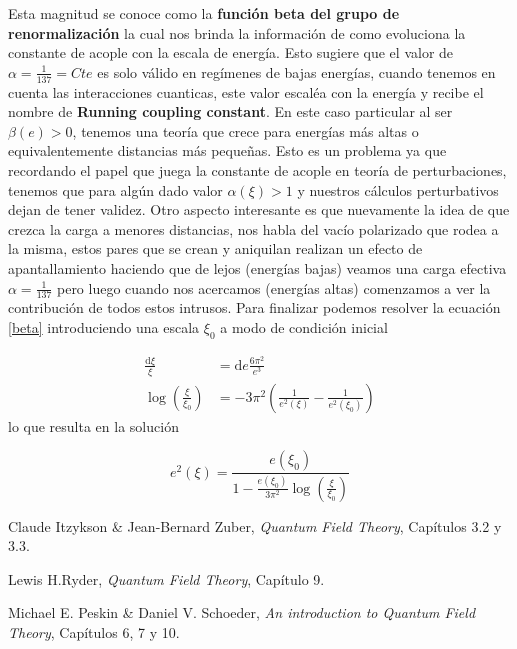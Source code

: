 \documentclass[tickz]{article}
\numberwithin{equation}{section}
\begin{document}
Esta magnitud se conoce como la \textbf{función beta del grupo de renormalización} la cual nos brinda la información de como evoluciona la constante de acople con la escala de energía.  Esto sugiere que el valor de $ \alpha= \frac{1}{137}=Cte $ es solo válido en regímenes de bajas energías, cuando tenemos en cuenta las interacciones cuanticas, este valor escaléa con la energía y recibe el nombre de \textbf{Running coupling constant}. En este caso particular al ser $ \beta(e)>0 $, tenemos una teoría que crece para energías más altas o equivalentemente distancias más pequeñas. Esto es un problema ya que recordando el papel que juega la constante de acople en teoría de perturbaciones, tenemos que para algún dado valor $ \alpha(\xi)>1  $ y nuestros cálculos perturbativos dejan de tener validez. Otro aspecto interesante es que nuevamente la idea de que crezca la carga a menores distancias, nos habla del vacío polarizado que rodea a la misma, estos pares que se crean y aniquilan realizan un efecto de apantallamiento haciendo que de lejos (energías bajas) veamos una carga efectiva $ \alpha =\frac{1}{137} $ pero luego cuando nos acercamos (energías altas) comenzamos a ver la contribución de todos estos intrusos. Para finalizar podemos resolver la ecuación \ref{beta} introduciendo una escala $ \xi_0 $ a modo de condición inicial

\begin{equation}\label{key}
\begin{aligned}
\frac{\mathrm{d}\xi}{\xi} &= \mathrm{d}e\frac{6\pi^2}{e^3}\\
\log\left(\frac{\xi}{\xi_0}\right) &= -3\pi^2 \left( \frac{1}{e^2(\xi)} - \frac{1}{e^2(\xi_0)}\right)
\end{aligned}
\end{equation}
lo que resulta en la solución

\begin{boxquation}
\begin{equation}
e^2(\xi) = \frac{e(\xi_0)}{1 -\frac{e(\xi_0)}{3\pi^2}\log\left(\frac{\xi}{\xi_0}\right)}
\end{equation}
\end{boxquation}

\begin{thebibliography}{9}
	
	Claude Itzykson \& Jean-Bernard Zuber,
	\textit{Quantum Field Theory},
	Capítulos 3.2 y 3.3.
	
	Lewis H.Ryder,
	\textit{Quantum Field Theory},
	Capítulo 9.
	
	Michael E. Peskin \& Daniel V. Schoeder,
	\textit{An introduction to Quantum Field Theory},
	Capítulos 6, 7 y 10.
	
\end{thebibliography}	
	
	
\end{document}
